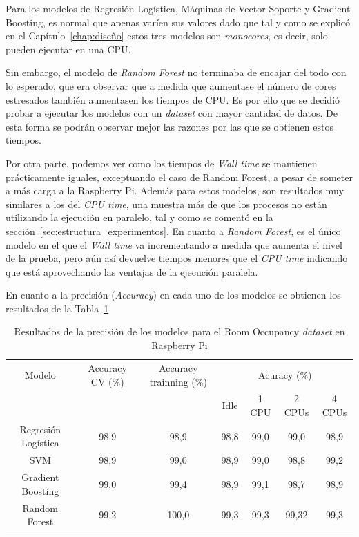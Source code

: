 \documentclass[a4paper, 12pt]{book}
\begin{document}
Para los modelos de Regresión Logística, Máquinas de Vector Soporte y Gradient Boosting, es normal que apenas varíen sus valores dado que tal y como se explicó en el Capítulo~\ref{chap:diseño} estos tres modelos son \textit{monocores}, es decir, solo pueden ejecutar en una CPU. 

Sin embargo, el modelo de \textit{Random Forest} no terminaba de encajar del todo con lo esperado, que era observar que a medida que aumentase el número de cores estresados también aumentasen los tiempos de CPU. Es por ello que se decidió probar a ejecutar los modelos con un \textit{dataset} con mayor cantidad de datos. De esta forma se podrán observar mejor las razones por las que se obtienen estos tiempos.

Por otra parte, podemos ver como los tiempos de \textit{Wall time} se mantienen prácticamente iguales, exceptuando el caso de Random Forest, a pesar de someter a más carga a la Raspberry Pi. Además para estos modelos, son resultados muy similares a los del \textit{CPU time}, una muestra más de que los procesos no están utilizando la ejecución en paralelo, tal y como se comentó en la sección~\ref{sec:estructura_experimentos}. En cuanto a \textit{Random Forest}, es el único modelo en el que el \textit{Wall time} va incrementando a medida que aumenta el nivel de la prueba, pero aún así devuelve tiempos menores que el \textit{CPU time} indicando que está aprovechando las ventajas de la ejecución paralela. 

En cuanto a la precisión (\textit{Accuracy}) en cada uno de los modelos se obtienen los resultados de la Tabla~\ref{tab:acc_Occraspberry}

\begin{table}[htb]
\renewcommand{\arraystretch}{1.5}
\begin{adjustbox}{width=\textwidth}
\centering
    \begin{tabular}{c  c  c  c  c  c  c}
    \hline
    Modelo & Accuracy CV (\%) & Accuracy trainning (\%) & \multicolumn{4}{c}{Acuracy (\%)} \\
    \cline{4-7}
     &   &   &  Idle & 1 CPU & 2 CPUs & 4 CPUs \\
     \hline
     Regresión Logística & 98,9 & 98,9 & 98,8 & 99,0 & 99,0 & 98,9\\
     SVM & 98,9 & 99,0 & 98,9 & 99,0 & 98,8 & 99,2\\
     Gradient Boosting & 99,0 & 99,4 & 98,9 & 99,1 & 98,7 & 98,9\\
     Random Forest & 99,2 & 100,0 & 99,3 & 99,3 & 99,32 & 99,3\\
    \hline
    \end{tabular}
\end{adjustbox}
\caption{Resultados de la precisión de los modelos para el Room Occupancy \textit{dataset} en Raspberry Pi}
\label{tab:acc_Occraspberry}
\end{table}
\end{document}
